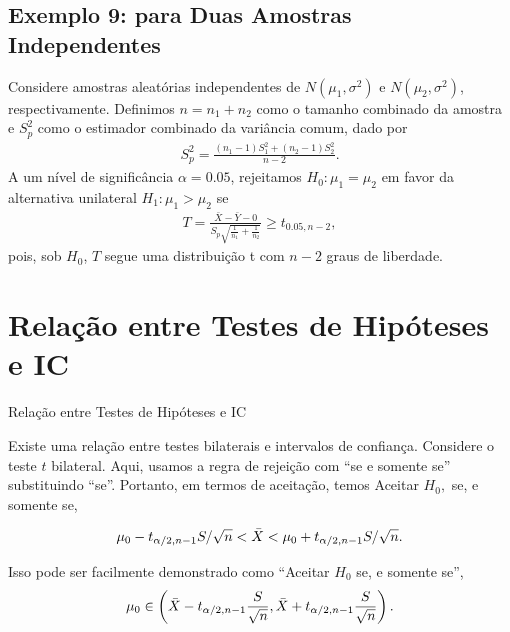 \documentclass[12pt]{beamer}
\begin{document}
\subsection{Exemplo 9: para Duas Amostras Independentes}
\begin{frame}{}
	\vspace{-0.2cm}
	\begin{block}{}
		\justifying
		Considere amostras aleatórias independentes de $N(\mu_1, \sigma^2)$ e $N(\mu_2, \sigma^2)$, respectivamente. Definimos $n = n_1 + n_2$ como o tamanho combinado da amostra e $S_{p}^2$ como o estimador combinado da variância comum, dado por
		\begin{align*}
			S_{p}^2 = \frac{(n_1 - 1)S_1^2 + (n_2 - 1)S_2^2}{n - 2}.
		\end{align*}
		A um nível de significância $\alpha = 0.05$, rejeitamos $H_0 : \mu_1 = \mu_2$ em favor da alternativa unilateral $H_1 : \mu_1 > \mu_2$ se
		\begin{align*}
			T = \frac{\bar{X} - \bar{Y} - 0}{S_p\sqrt{\frac{1}{n_1} + \frac{1}{n_2}}}  \geq t_{0.05, n-2},
		\end{align*}
		pois, sob $H_0$, $T$ segue uma distribuição t com $n - 2$ graus de liberdade.
	\end{block}
\end{frame}

\section{Relação entre Testes de Hipóteses e IC}
\begin{frame}{Relação entre Testes de Hipóteses e IC}
\begin{block}{}
\justifying
Existe uma relação entre testes bilaterais e intervalos de confiança. Considere o teste $t$ bilateral. Aqui, usamos a regra de rejeição com ``se e somente se'' substituindo ``se''. Portanto, em termos de aceitação, temos Aceitar $H_0,$ se, e somente se,

\begin{align*}
\mu_0 - t_{\alpha/2, n-1}S/\sqrt{n} < \Bar{X} < \mu_0 + t_{\alpha/2, n-1}S/\sqrt{n}.
\end{align*}
\end{block}
\pause
\begin{block}{}
Isso pode ser facilmente demonstrado como ``Aceitar $H_0$ se, e somente se'',
\begin{align*}
\mu_0 \in \left(\Bar{X} - t_{\alpha/2, n-1}\frac{S}{\sqrt{n}}, \Bar{X} + t_{\alpha/2, n-1}\frac{S}{\sqrt{n}}\right).
\end{align*}
\end{block}
\end{frame}
\end{document}
